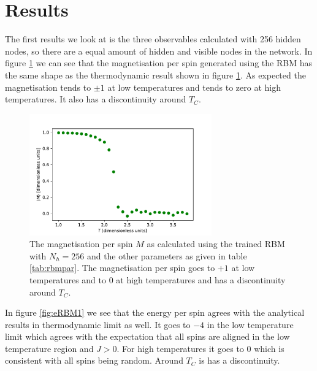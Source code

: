 \documentclass[10 pt, a4paper]{article}
\begin{document}
\newpage

\section{Results}

The first results we look at is the three observables calculated with 256 hidden nodes, so there are a equal amount of hidden and visible nodes in the network. In figure \ref{fig:magRBM1} we can see that the magnetisation per spin generated using the RBM has the same shape as the thermodynamic result shown in figure \ref{fig:magRBM1}. As expected the magnetisation tends to $\pm 1$ at low temperatures and tends to zero at high temperatures. It also has a discontinuity around $T_C$.

\begin{figure}[H] 
\centering
\includegraphics[width=0.7\textwidth]{magRBM}
\caption{The magnetisation per spin $M$ as calculated using the trained RBM with $N_h = 256$ and the other parameters as given in table \ref{tab:rbmpar}. The magnetisation per spin goes to $+1$ at low temperatures and to 0 at high temperatures and has a discontinuity around $T_C$.}
\label{fig:magRBM1}
\end{figure}

In figure \ref{fig:eRBM1} we see that the energy per spin agrees with the analytical results in thermodynamic limit as well. It goes to $-4$ in the low temperature limit which agrees with the expectation that all spins are aligned in the low temperature region and $J > 0$. For high temperatures it goes to 0 which is consistent with all spins being random. Around $T_C$ is has a discontinuity.
\end{document}

